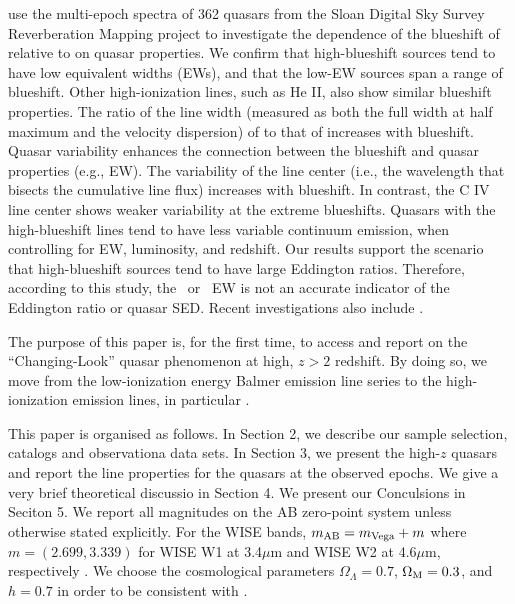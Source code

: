 \documentclass[a4paper,fleqn,usenatbib]{mnras}
\begin{document}
\citet{Sun2018} use the multi-epoch spectra of 362 quasars from the
Sloan Digital Sky Survey Reverberation Mapping project to investigate
the dependence of the blueshift of \civ relative to \mgii on quasar
properties. We confirm that high-blueshift sources tend to have low
\civ equivalent widths (EWs), and that the low-EW sources span a range
of blueshift. Other high-ionization lines, such as He II, also show
similar blueshift properties. The ratio of the line width (measured as
both the full width at half maximum and the velocity dispersion) of
\civ to that of \mgii increases with blueshift. Quasar variability
enhances the connection between the \civ blueshift and quasar
properties (e.g., EW). The variability of the \mgii line center (i.e.,
the wavelength that bisects the cumulative line flux) increases with
blueshift. In contrast, the C IV line center shows weaker variability
at the extreme blueshifts. Quasars with the high-blueshift \civ lines
tend to have less variable continuum emission, when controlling for
EW, luminosity, and redshift. Our results support the scenario that
high-blueshift sources tend to have large Eddington ratios.
Therefore, according to this study, the \civ\ or \heii\ EW is not an
accurate indicator of the Eddington ratio or quasar SED.
Recent investigations also include \citet{Meyer2019}. 

The purpose of this paper is, for the first time, to access and 
report on the ``Changing-Look'' quasar phenomenon at high, 
$z>2$ redshift. By doing so, we move from the low-ionization 
energy Balmer emission line series to the high-ionization emission 
lines, in particular \civ. 

This paper is organised as follows. In Section 2, we describe our
sample selection, catalogs and observationa data sets.  In Section 3,
we present the high-$z$ quasars and report the line properties for the
quasars at the observed epochs.  We give a very brief theoretical
discussio in Section 4. We present our Conculsions in Seciton 5.  We
report all magnitudes on the AB zero-point system \citep{Oke_Gunn1983,
Fukugita1996} unless otherwise stated explicitly. For the WISE bands,
$m_{\rm AB} = m_{\rm Vega} + m$ where $m = (2.699, 3.339)$ for WISE W1
at 3.4$\mu$m and WISE W2 at 4.6$\mu$m, respectively
\citep{Cutri2011}. We choose the cosmological parameters
$\Omega_{\Lambda} = 0.7$, $\Omega_{\rm M} = 0.3$, and $h = 0.7$ in
order to be consistent with \citet{Shen2011}.
\end{document}
